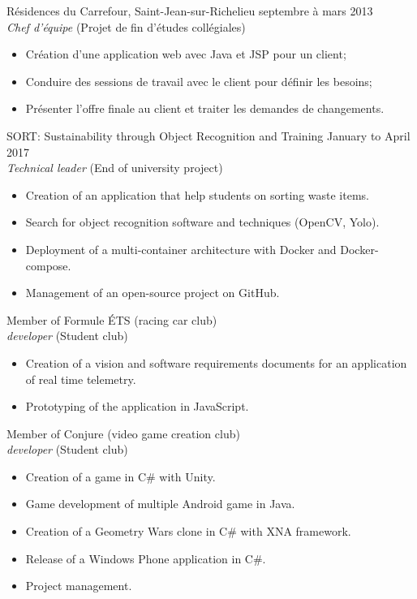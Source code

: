 \documentclass{res}
\newcommand{\inEnglish}[1]{#1}
\begin{document}
\begin{resume}
{	%
	Résidences du Carrefour, Saint-Jean-sur-Richelieu
	\hfill septembre à mars 2013 \\
	{\sl Chef d'équipe} \hfill (Projet de fin d'études collégiales)
	\vspace{0.05in}

	\begin{itemize} \itemsep -2pt
		\item Création d’une application web avec Java et JSP pour un client;
		\item Conduire des sessions de travail avec le client pour définir les besoins;
		\item Présenter l’offre finale au client et traiter les demandes de changements.
	\end{itemize}

}

\inEnglish{
	SORT: Sustainability through Object Recognition and Training
	\hfill January to April 2017 \\
	{\sl Technical leader} \hfill (End of university project)
	\vspace{0.05in}
	\begin{itemize} \itemsep -2pt
		\item Creation of an application that help students on sorting waste items.
		\item Search for object recognition software and techniques (OpenCV, Yolo).
		\item Deployment of a multi-container architecture with Docker and Docker-compose.
		\item Management of an open-source project on GitHub.
	\end{itemize}

	Member of Formule ÉTS (racing car club) \\
	{\sl developer} \hfill (Student club)
	\vspace{0.05in}
	\begin{itemize} \itemsep -2pt
		\item Creation of a vision and software requirements documents for an application of real time telemetry.
		\item Prototyping of the application in JavaScript.
	\end{itemize}

	Member of Conjure (video game creation club) \\
	{\sl developer} \hfill (Student club)
	\vspace{0.05in}
	\begin{itemize} \itemsep -2pt
		\item Creation of a game in C\# with Unity.
		\item Game development of multiple Android game in Java.
		\item Creation of a Geometry Wars clone in C\# with XNA framework.
		\item Release of a Windows Phone application in C\#.
		\item Project management.
	\end{itemize}

}
\end{resume}
\end{document}
